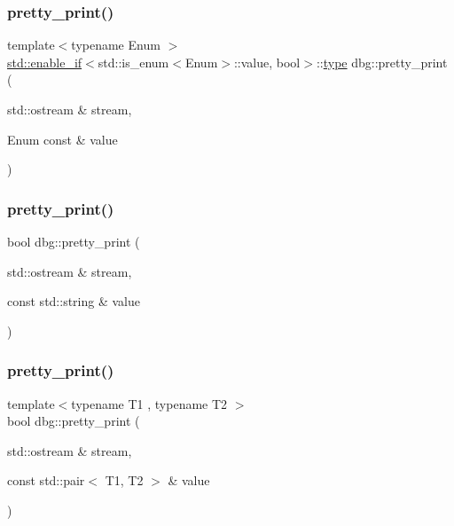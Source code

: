 \mbox{\label{namespacedbg_acd3034b7476cdf474e46eb2bbca6e0d1}} 
\subsubsection{\texorpdfstring{pretty\+\_\+print()}{pretty\_print()}\hspace{0.1cm}{\footnotesize\ttfamily [16/19]}}
{\footnotesize\ttfamily template$<$typename Enum $>$ \\
\hyperlink{structstd_1_1enable__if}{std\+::enable\+\_\+if}$<$std\+::is\+\_\+enum$<$Enum$>$\+::value, bool$>$\+::\hyperlink{namespacedbg_a2365d80e3a3525e6025040383ff8661b}{type} dbg\+::pretty\+\_\+print (\begin{DoxyParamCaption}\item[{std\+::ostream \&}]{stream,  }\item[{Enum const \&}]{value }\end{DoxyParamCaption})\hspace{0.3cm}{\ttfamily [inline]}}

\mbox{\label{namespacedbg_ae620aa6031e088dc11e1df853e38f5fa}} 
\subsubsection{\texorpdfstring{pretty\+\_\+print()}{pretty\_print()}\hspace{0.1cm}{\footnotesize\ttfamily [17/19]}}
{\footnotesize\ttfamily bool dbg\+::pretty\+\_\+print (\begin{DoxyParamCaption}\item[{std\+::ostream \&}]{stream,  }\item[{const std\+::string \&}]{value }\end{DoxyParamCaption})\hspace{0.3cm}{\ttfamily [inline]}}

\mbox{\label{namespacedbg_adf02078069da78815c208dd638a01640}} 
\subsubsection{\texorpdfstring{pretty\+\_\+print()}{pretty\_print()}\hspace{0.1cm}{\footnotesize\ttfamily [18/19]}}
{\footnotesize\ttfamily template$<$typename T1 , typename T2 $>$ \\
bool dbg\+::pretty\+\_\+print (\begin{DoxyParamCaption}\item[{std\+::ostream \&}]{stream,  }\item[{const std\+::pair$<$ T1, T2 $>$ \&}]{value }\end{DoxyParamCaption})\hspace{0.3cm}{\ttfamily [inline]}}

